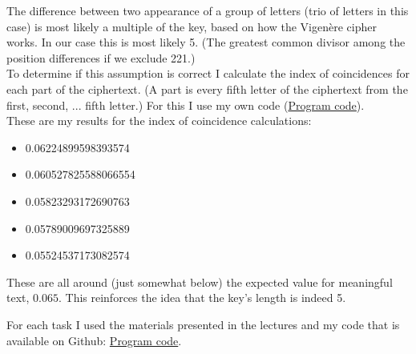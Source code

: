 \documentclass{article}
\begin{document}
\begin{enumerate}[label={}]
\begin{itemize}
		\end{itemize}
		The difference between two appearance of a group of letters (trio of letters in this case) is most likely a multiple of the key, based on how the Vigenère cipher works. In our case this is most likely 5. (The greatest common divisor among the position differences if we exclude 221.)\\
		To determine if this assumption is correct I calculate the index of coincidences for each part of the ciphertext. (A part is every fifth letter of the ciphertext from the first, second, ... fifth letter.) For this I use my own code (\hyperlink{https://github.com/halkszavu/Encryption-Homework-2025/blob/main/Code/Homework-Calculations/Homework-Calculations/Program.cs}{Program code}).\\
		These are my results for the index of coincidence calculations:
		\begin{itemize}		
			 \item  0.06224899598393574
			 \item  0.060527825588066554
			 \item  0.05823293172690763
			 \item  0.05789009697325889
			 \item  0.05524537173082574
		\end{itemize}
		These are all around (just somewhat below) the expected value for meaningful text, $0.065$. This reinforces the idea that the key's length is indeed 5.
\end{enumerate}

For each task I used the materials presented in the lectures and my code that is available on Github: \hyperlink{https://github.com/halkszavu/Encryption-Homework-2025/blob/main/Code/Homework-Calculations/Homework-Calculations/Program.cs}{Program code}.
\end{document}
